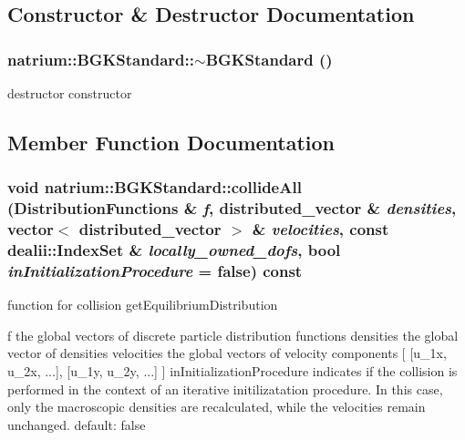 \subsection{Constructor \& Destructor Documentation}
\hypertarget{classnatrium_1_1BGKStandard_aa55035be79098a762cf4f0ef308d41e5}{
\subsubsection[{$\sim$BGKStandard}]{\setlength{\rightskip}{0pt plus 5cm}natrium::BGKStandard::$\sim$BGKStandard ()}}
\label{classnatrium_1_1BGKStandard_aa55035be79098a762cf4f0ef308d41e5}


destructor constructor 

\subsection{Member Function Documentation}
\hypertarget{classnatrium_1_1BGKStandard_a8e0493b063d56275d7ee607e25c4145e}{
\subsubsection[{collideAll}]{\setlength{\rightskip}{0pt plus 5cm}void natrium::BGKStandard::collideAll ({\bf DistributionFunctions} \& {\em f}, \/  distributed\_\-vector \& {\em densities}, \/  vector$<$ distributed\_\-vector $>$ \& {\em velocities}, \/  const dealii::IndexSet \& {\em locally\_\-owned\_\-dofs}, \/  bool {\em inInitializationProcedure} = {\ttfamily false}) const}}
\label{classnatrium_1_1BGKStandard_a8e0493b063d56275d7ee607e25c4145e}


function for collision getEquilibriumDistribution

f the global vectors of discrete particle distribution functions densities the global vector of densities velocities the global vectors of velocity components \mbox{[} \mbox{[}u\_\-1x, u\_\-2x, ...\mbox{]}, \mbox{[}u\_\-1y, u\_\-2y, ...\mbox{]} \mbox{]} inInitializationProcedure indicates if the collision is performed in the context of an iterative initilizatation procedure. In this case, only the macroscopic densities are recalculated, while the velocities remain unchanged. default: false 

